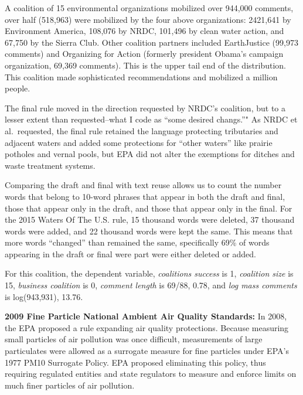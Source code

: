 \documentclass[
]{book}
\begin{document}
A coalition of 15 environmental organizations mobilized over 944,000 comments, over half (518,963) were mobilized by the four above organizations: 2421,641 by Environment America, 108,076 by NRDC, 101,496 by clean water action, and 67,750 by the Sierra Club. Other coalition partners included EarthJustice (99,973 comments) and Organizing for Action (formerly president Obama's campaign organization, 69,369 comments). This is the upper tail end of the distribution. This coalition made sophisticated recommendations and mobilized a million people.

The final rule moved in the direction requested by NRDC's coalition, but to a lesser extent than requested--what I code as ``some desired changs.''" As NRDC et al.~requested, the final rule retained the language protecting tributaries and adjacent waters and added some protections for ``other waters'' like prairie potholes and vernal pools, but EPA did not alter the exemptions for ditches and waste treatment systems.

Comparing the draft and final with text reuse allows us to count the number words that belong to 10-word phrases that appear in both the draft and final, those that appear only in the draft, and those that appear only in the final. For the 2015 Waters Of The U.S. rule, 15 thousand words were deleted, 37 thousand words were added, and 22 thousand words were kept the same. This means that more words ``changed'' than remained the same, specifically 69\% of words appearing in the draft or final were part were either deleted or added.

For this coalition, the dependent variable, \emph{coalitions success} is 1, \emph{coalition size} is 15, \emph{business coalition} is 0, \emph{comment length} is 69/88, 0.78, and \emph{log mass comments} is log(943,931), 13.76.

\textbf{2009 Fine Particle National Ambient Air Quality Standards:} In 2008, the EPA proposed a rule expanding air quality protections. Because measuring small particles of air pollution was once difficult, measurements of large particulates were allowed as a surrogate measure for fine particles under EPA's 1977 PM10 Surrogate Policy. EPA proposed eliminating this policy, thus requiring regulated entities and state regulators to measure and enforce limits on much finer particles of air pollution.
\end{document}
